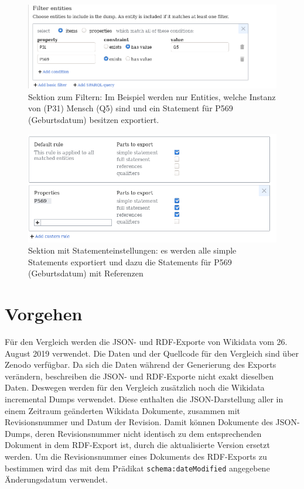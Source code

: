 \begin{figure}
  \includegraphics[width=\textwidth]{pics/screen-filter}
  \caption{Sektion zum Filtern: Im Beispiel werden nur Entities, welche Instanz von (P31) Mensch (Q5) sind und ein Statement für P569 (Geburtsdatum) besitzen exportiert.}
  \label{fig:screen-filter}
\end{figure}

\begin{figure}
  \includegraphics[width=\textwidth]{pics/screen-statements}
  \caption{Sektion mit Statementeinstellungen: es werden alle simple Statements exportiert und dazu die Statements für P569 (Geburtsdatum) mit Referenzen}
  \label{fig:screen-statements}
\end{figure}

\section{Vorgehen}
Für den Vergleich werden die JSON- und RDF-Exporte von Wikidata vom 26. August 2019 verwendet.
Die Daten und der Quellcode für den Vergleich sind über Zenodo verfügbar\cite{zenodo-diff-data}.
Da sich die Daten während der Generierung des Exports verändern, beschreiben die JSON- und RDF-Exporte nicht exakt dieselben Daten.
Deswegen werden für den Vergleich zusätzlich noch die Wikidata incremental Dumps verwendet.
Diese enthalten die JSON-Darstellung aller in einem Zeitraum geänderten Wikidata Dokumente, zusammen mit Revisionsnummer und Datum der Revision. 
Damit können Dokumente des JSON-Dumps, deren Revisionsnummer nicht identisch zu dem entsprechenden Dokument in dem RDF-Export ist, durch die aktualisierte Version ersetzt werden.
Um die Revisionsnummer eines Dokuments des RDF-Exports zu bestimmen wird das mit dem Prädikat \verb|schema:dateModified| angegebene Änderungsdatum verwendet.

